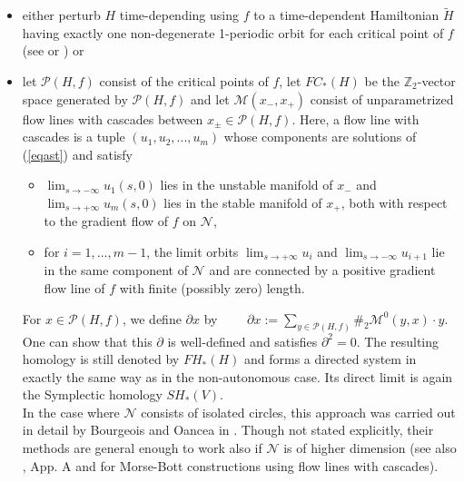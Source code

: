 \documentclass[a4paper,12pt,bibliography=totocnumbered,titlepage=false,abstracton,bookmarksnumbered=true]{scrartcl}
\theoremstyle{definition}
\begin{document}
\begin{itemize}
 \item either perturb $H$ time-depending using $f$ to a time-dependent Hamiltonian $\widetilde{H}$ having exactly one non-degenerate 1-periodic orbit for each critical point of $f$ (see \cite{Oan} or \cite{CiFlHoWy}) or
 \item let $\mathcal{P}(H,f)$ consist of the critical points of $f$, let $FC_\ast(H)$ be the $\mathbb{Z}_2$-vector space generated by $\mathcal{P}(H,f)$ and let $\mathcal{M}(x_-,x_+)$ consist of unparametrized flow lines with cascades between $x_\pm\in\mathcal{P}(H,f)$. Here, a flow line with cascades is a tuple $(u_1,u_2,...,u_m)$ whose components are solutions of (\ref{eqast}) and satisfy
 \begin{itemize}
  \item $\displaystyle \lim_{s\rightarrow-\infty} u_1(s,0)$ lies in the unstable manifold of $x_-$ and $\displaystyle\lim_{s\rightarrow+\infty} u_m(s,0)$ lies in the stable manifold of $x_+$, both with respect to the gradient flow of $f$ on $\mathcal{N}$,
  \item for $i=1,...,m{-}1$, the limit orbits $\displaystyle \lim_{s\rightarrow+\infty}u_i$ and $\displaystyle \lim_{s\rightarrow-\infty}u_{i+1}$ lie in the same component of $\mathcal{N}$ and are connected by a positive gradient flow line of $f$ with finite (possibly zero) length.
 \end{itemize}
For $x\in\mathcal{P}(H,f)$, we define $\partial x$ by $\displaystyle \qquad\partial x:=\sum_{y\in\mathcal{P}(H,f)}\#_2\mathcal{M}^0(y,x)\cdot y.$\medskip\\
One can show that this $\partial$ is well-defined and satisfies $\partial ^2=0$. The resulting homology is still denoted by $FH_\ast(H)$ and forms a directed system in exactly the same way as in the non-autonomous case. Its direct limit is again the Symplectic homology $SH_\ast(V)$.\\
In the case where $\mathcal{N}$ consists of isolated circles, this approach was carried out in detail by Bourgeois and Oancea  in \cite{BourOan1}. Though not stated explicitly, their methods are general enough to work also if $\mathcal{N}$ is of higher dimension (see also \cite{Fra}, App. A and \cite{FauckThesis} for Morse-Bott constructions using flow lines with cascades).
\end{itemize}
\end{document}
